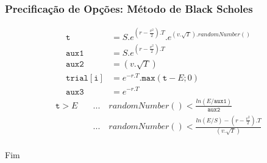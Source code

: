 \documentclass{beamer}
\begin{document}
\begin{frame}

\frametitle{Precificação de Opções: Método de Black Scholes}
	
\begin{equation}
	\begin{aligned}
		\mathtt{t}			&= S.e^{(r-\frac{v^2}{2}).T}.e^{(v.\sqrt{T}).randomNumber()}\\
		\mathtt{aux1}		&= S.e^{(r-\frac{v^2}{2}).T}\\
		\mathtt{aux2}		&= (v.\sqrt{T})\\
		\mathtt{trial[i]}	&= e^{-r.T}.\mathtt{max}(\mathtt{t}-E;0)\\
		\mathtt{aux3}		&= e^{-r.T}
	\end{aligned}
\end{equation}
\begin{equation}
	\begin{aligned}
	\mathtt{t}>E \quad &... \quad randomNumber() < \frac{ln(E/\mathtt{aux1})}{\mathtt{aux2}}\\
					   &... \quad randomNumber() < \frac{ln(E/S) - (r-\frac{v^2}{2}).T}{(v.\sqrt{T})}\\
	\end{aligned}
\end{equation}

\end{frame}
	

\begin{frame}
\Huge{\centerline{Fim}}
\end{frame}

\end{document}
